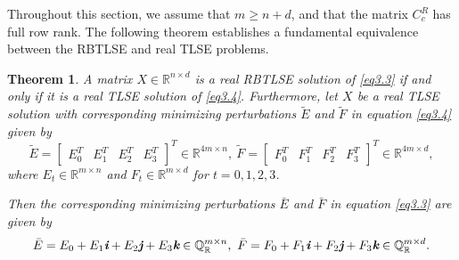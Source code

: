 \documentclass[preprint,11pt,3p]{elsarticle}
\newtheorem{theorem}{Theorem}[section]
\def \R{{\mathbb R}}
\def \QR{\mathbb{Q}_\mathbb{R}}
\def \i{\textit{\textbf{i}}}
\def \j{\textit{\textbf{j}}}
\def \k{\textit{\textbf{k}}}
\begin{document}
Throughout this section, we assume that $m \geq n+d$, and that the matrix $C^R_c$ has full row rank. The following theorem establishes a fundamental equivalence between the RBTLSE and real TLSE problems.
\begin{theorem}\label{thm3.1}
	A matrix $X \in \R^{n \times d}$ is a real RBTLSE solution of \eqref{eq3.3} if and only if it is a real TLSE solution of \eqref{eq3.4}. Furthermore, let $X$ be a real TLSE solution with corresponding minimizing perturbations $\widetilde{E}$ and $\widetilde{F}$ in equation \eqref{eq3.4} given by
	\begin{equation*}
		\widetilde{E} = \begin{bmatrix} E_0^T & E_1^T & E_2^T & E_3^T \end{bmatrix}^T \in \R^{4m \times n}, ~
		\widetilde{F} = \begin{bmatrix} F_0^T & F_1^T & F_2^T & F_3^T \end{bmatrix}^T \in \R^{4m \times d},
	\end{equation*}
where $E_t \in \R^{m \times n}$ and $F_t \in \R^{m \times d}$ for $t=0,1,2,3$.

Then the corresponding minimizing perturbations $\bar{E}$ and $\bar{F}$ in equation \eqref{eq3.3} are given by
\begin{equation*}
	\bar{E} = E_0 + E_1\i + E_2\j + E_3\k \in \QR^{m \times n}, ~
	\bar{F} = F_0 + F_1\i + F_2\j + F_3\k \in \QR^{m \times d}.
\end{equation*}
\end{theorem}
\end{document}
